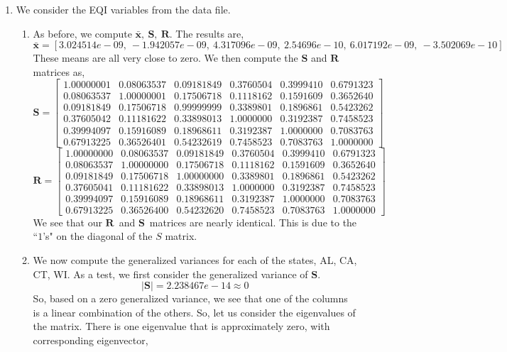 \documentclass[letterpaper,10pt]{article}
\newcommand{\eS}{$\textbf{S}$}
\newcommand{\R}{$\textbf{R}$}
\begin{document}
\begin{enumerate}
\begin{enumerate}
\end{enumerate}
\item We consider the EQI variables from the data file. 
\begin{enumerate}
\item As before, we compute $\bar{\textbf{x}},\ \textbf{S},\ \textbf{R}$. The results are,
\[\bar{\textbf{x}}=[3.024514e-09,\ -1.942057e-09,\ 4.317096e-09,\ 2.54696e-10,\ 6.017192e-09,\ -3.502069e-10]\]
These means are all very close to zero. We then compute the $\textbf{S}$ and $\textbf{R}$ matrices as,
\[\textbf{S}=\begin{bmatrix}
1.00000001 & 0.08063537 & 0.09181849 & 0.3760504 & 0.3999410 & 0.6791323\\
0.08063537 & 1.00000001 & 0.17506718 & 0.1118162 & 0.1591609 & 0.3652640\\
0.09181849 & 0.17506718 & 0.99999999 & 0.3389801 & 0.1896861 & 0.5423262\\
0.37605042 & 0.11181622 & 0.33898013 & 1.0000000 & 0.3192387 & 0.7458523\\
0.39994097 & 0.15916089 & 0.18968611 & 0.3192387 & 1.0000000 & 0.7083763\\
0.67913225 & 0.36526401 & 0.54232619 & 0.7458523 & 0.7083763 & 1.0000000
\end{bmatrix}\]
\[\textbf{R}=\begin{bmatrix}
1.00000000 & 0.08063537 & 0.09181849 & 0.3760504 & 0.3999410 & 0.6791323\\
0.08063537 & 1.00000000 & 0.17506718 & 0.1118162 & 0.1591609 & 0.3652640\\
0.09181849 & 0.17506718 & 1.00000000 & 0.3389801 & 0.1896861 & 0.5423262\\
0.37605041 & 0.11181622 & 0.33898013 & 1.0000000 & 0.3192387 & 0.7458523\\
0.39994097 & 0.15916089 & 0.18968611 & 0.3192387 & 1.0000000 & 0.7083763\\
0.67913225 & 0.36526400 & 0.54232620 & 0.7458523 & 0.7083763 & 1.0000000
\end{bmatrix} \]
We see that our \R \ and \eS \ matrices are nearly identical. This is due to the ``$1$'s" on the diagonal of the $S$ matrix.
\item We now compute the generalized variances for each of the states, AL, CA, CT, WI. As a test, we first consider the generalized variance of $\textbf{S}$.
\[|\textbf{S}|=2.238467e-14\approx 0\]
So, based on a zero generalized variance, we see that one of the columns is a linear combination of the others. So, let us consider the eigenvalues of the matrix. There is one eigenvalue that is approximately zero, with corresponding eigenvector,

\end{enumerate}
\end{enumerate}
\end{document}
